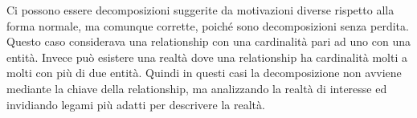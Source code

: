 \documentclass{article}
\numberwithin{equation}{subsection}
\begin{document}

Ci possono essere decomposizioni suggerite da motivazioni diverse rispetto alla forma normale, ma comunque corrette, poiché sono decomposizioni senza perdita. 
Questo caso considerava una relationship con una cardinalità pari ad uno con una entità. Invece può esistere una realtà dove una relationship ha cardinalità 
molti a molti con più di due entità. Quindi in questi casi la decomposizione non avviene mediante la chiave della relationship, ma analizzando la realtà di 
interesse ed invidiando legami più adatti per descrivere la realtà. 

\clearpage
\end{document}

